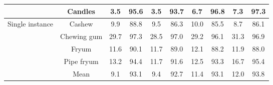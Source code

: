 \documentclass[runningheads]{llncs}
\begin{document}
\begin{table*}[!ht]
{\begin{tabular}{cc|cccccccc}
    \multicolumn{1}{c|}{}                                    & Candles     & 3.5   & 95.6                        & 3.5   & \multicolumn{1}{c|}{93.7}   & 6.7   & 96.8                        & 7.3        & 97.3        \\ \hline
    \multicolumn{1}{c|}{\multirow{4}{*}{Single instance}}    & Cashew      & 9.9   & 88.8                        & 9.5   & \multicolumn{1}{c|}{86.3}   & 10.0  & 85.5                        & 8.7        & 86.1        \\
    \multicolumn{1}{c|}{}                                    & Chewing gum & 29.7  & 97.3                        & 28.5  & \multicolumn{1}{c|}{97.0}   & 29.2  & 96.1                        & 31.3       & 96.9        \\
    \multicolumn{1}{c|}{}                                    & Fryum       & 11.6  & 90.1                        & 11.7  & \multicolumn{1}{c|}{89.0}   & 12.1  & 88.2                        & 11.9       & 88.0        \\
    \multicolumn{1}{c|}{}                                    & Pipe fryum  & 13.2  & 94.4                        & 11.7  & \multicolumn{1}{c|}{91.6}   & 12.5  & 93.3                        & 16.7       & 95.4        \\ \hline
    \multicolumn{1}{c|}{}                                    & Mean        &       9.1 & 93.1 & 9.4 & \multicolumn{1}{c|}{92.7} & 11.4 & 93.1 & 12.0 & 93.8 \\ \hline
    \end{tabular}}
\end{table*}
\end{document}
